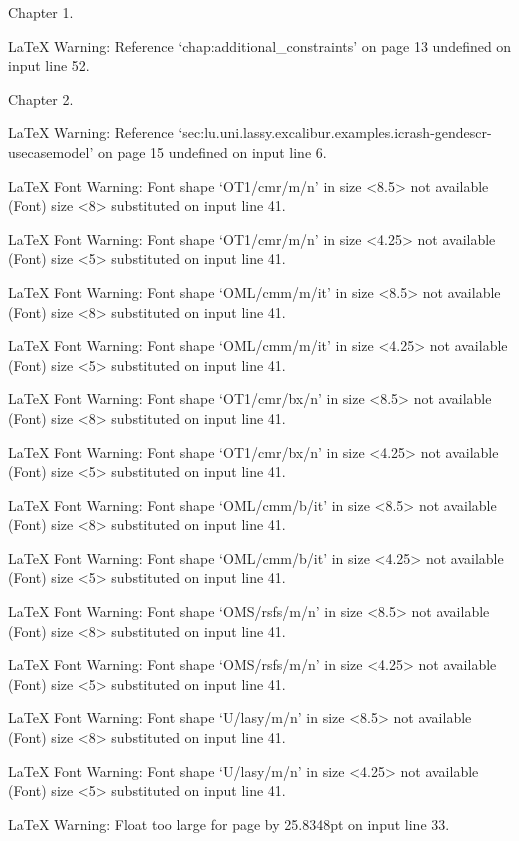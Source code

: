 Chapter 1.

LaTeX Warning: Reference `chap:additional_constraints' on page 13 undefined on input line 52.

Chapter 2.

LaTeX Warning: Reference `sec:lu.uni.lassy.excalibur.examples.icrash-gendescr-usecasemodel' on page 15 undefined on input line 6.


LaTeX Font Warning: Font shape `OT1/cmr/m/n' in size <8.5> not available
(Font)              size <8> substituted on input line 41.


LaTeX Font Warning: Font shape `OT1/cmr/m/n' in size <4.25> not available
(Font)              size <5> substituted on input line 41.


LaTeX Font Warning: Font shape `OML/cmm/m/it' in size <8.5> not available
(Font)              size <8> substituted on input line 41.


LaTeX Font Warning: Font shape `OML/cmm/m/it' in size <4.25> not available
(Font)              size <5> substituted on input line 41.


LaTeX Font Warning: Font shape `OT1/cmr/bx/n' in size <8.5> not available
(Font)              size <8> substituted on input line 41.


LaTeX Font Warning: Font shape `OT1/cmr/bx/n' in size <4.25> not available
(Font)              size <5> substituted on input line 41.


LaTeX Font Warning: Font shape `OML/cmm/b/it' in size <8.5> not available
(Font)              size <8> substituted on input line 41.


LaTeX Font Warning: Font shape `OML/cmm/b/it' in size <4.25> not available
(Font)              size <5> substituted on input line 41.


LaTeX Font Warning: Font shape `OMS/rsfs/m/n' in size <8.5> not available
(Font)              size <8> substituted on input line 41.


LaTeX Font Warning: Font shape `OMS/rsfs/m/n' in size <4.25> not available
(Font)              size <5> substituted on input line 41.


LaTeX Font Warning: Font shape `U/lasy/m/n' in size <8.5> not available
(Font)              size <8> substituted on input line 41.


LaTeX Font Warning: Font shape `U/lasy/m/n' in size <4.25> not available
(Font)              size <5> substituted on input line 41.


LaTeX Warning: Float too large for page by 25.8348pt on input line 33.


